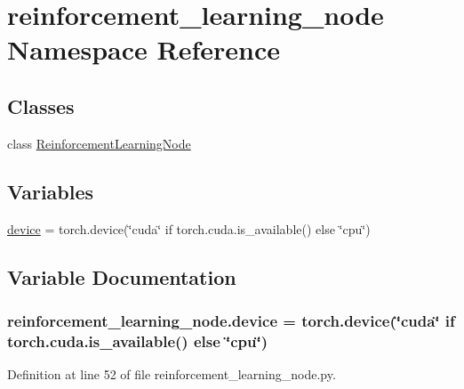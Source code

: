 \hypertarget{namespacereinforcement__learning__node}{}\section{reinforcement\+\_\+learning\+\_\+node Namespace Reference}
\label{namespacereinforcement__learning__node}
\subsection*{Classes}
\begin{DoxyCompactItemize}
\item 
class \hyperlink{classreinforcement__learning__node_1_1_reinforcement_learning_node}{Reinforcement\+Learning\+Node}
\end{DoxyCompactItemize}
\subsection*{Variables}
\begin{DoxyCompactItemize}
\item 
\hyperlink{namespacereinforcement__learning__node_ae6916f0d800aa061a4ef420a3c8624dd}{device} = torch.\+device(\char`\"{}cuda\char`\"{} if torch.\+cuda.\+is\+\_\+available() else \char`\"{}cpu\char`\"{})
\end{DoxyCompactItemize}


\subsection{Variable Documentation}
\subsubsection[{\texorpdfstring{device}{device}}]{\setlength{\rightskip}{0pt plus 5cm}reinforcement\+\_\+learning\+\_\+node.\+device = torch.\+device(\char`\"{}cuda\char`\"{} if torch.\+cuda.\+is\+\_\+available() else \char`\"{}cpu\char`\"{})}\hypertarget{namespacereinforcement__learning__node_ae6916f0d800aa061a4ef420a3c8624dd}{}\label{namespacereinforcement__learning__node_ae6916f0d800aa061a4ef420a3c8624dd}


Definition at line 52 of file reinforcement\+\_\+learning\+\_\+node.\+py.

